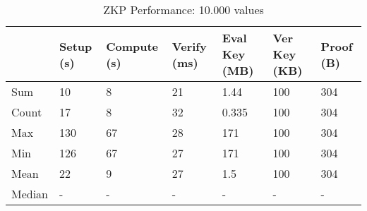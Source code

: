 \begin{table}[!htb]
\centering
\begin{tabular}{|l|l|l|l|l|l|l|}
\hline
 & Setup (s) & Compute (s) & Verify (ms) & Eval Key (MB) & Ver Key (KB) & Proof (B)  \\ \hline
 Sum & 10 & 8 & 21 & 1.44 & 100 & 304 \\ \hline
 Count & 17 & 8 & 32 & 0.335 & 100 & 304 \\ \hline
 Max & 130 & 67 & 28 & 171 & 100 & 304 \\ \hline
 Min & 126 & 67 & 27 & 171 & 100 & 304 \\ \hline
 Mean & 22 & 9 & 27 & 1.5 & 100 & 304 \\ \hline
 Median & - & - & - & - & - & - \\ \hline
\end{tabular}
\captionsetup{format=hang, justification=centering}
\caption{ZKP Performance: 10.000 values}
\label{table:zkp_03}
\end{table}
